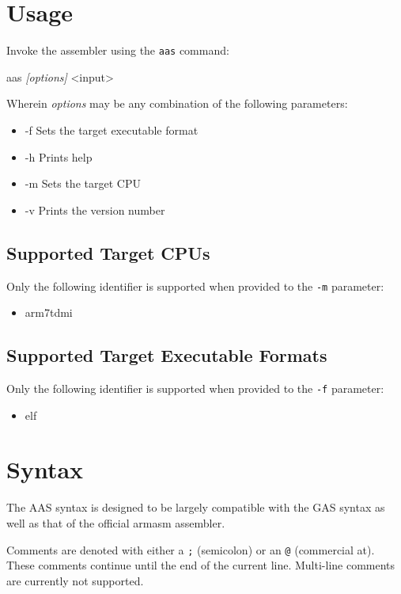 \documentclass[a4paper]{article}
\begin{document}
	\clearpage
	\section{Usage}
		Invoke the assembler using the \texttt{aas} command:

		\begin{center}
			\ttfamily
			aas \textit{[options]} <input>
		\end{center}

		Wherein \textit{options} may be any combination of the following parameters:

		\begin{itemize}
			\item -f\quad{} Sets the target executable format
			\item -h\quad{} Prints help
			\item -m\quad{} Sets the target CPU
			\item -v\quad{} Prints the version number
		\end{itemize}

		\subsection{Supported Target CPUs}
			Only the following identifier is supported when provided to the \texttt{-m} parameter:

			\begin{itemize}
				\item arm7tdmi
			\end{itemize}

		\subsection{Supported Target Executable Formats}
			Only the following identifier is supported when provided to the \texttt{-f} parameter:

			\begin{itemize}
				\item elf
			\end{itemize}

	\clearpage
	\section{Syntax}
		The AAS syntax is designed to be largely compatible with the GAS syntax as well as that of the official armasm assembler.

		Comments are denoted with either a \texttt{;} (semicolon) or an \texttt{@} (commercial at). These comments continue until the end of the current line. Multi-line comments are currently not supported.
\end{document}
